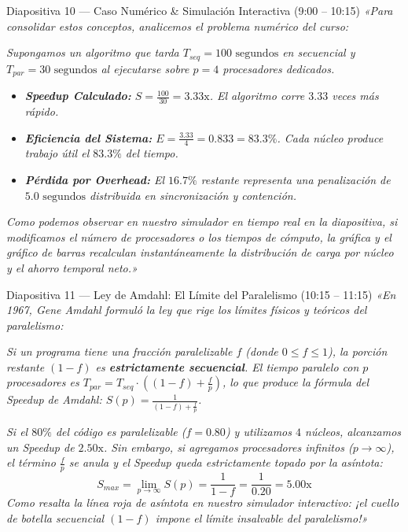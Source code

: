 \documentclass[11pt,a4paper]{article}
\begin{document}
\begin{guionbox}{Diapositiva 10 --- Caso Numérico \& Simulación Interactiva (9:00 -- 10:15)}
\textit{«Para consolidar estos conceptos, analicemos el problema numérico del curso:}

\textit{Supongamos un algoritmo que tarda $T_{seq} = 100\text{ segundos}$ en secuencial y $T_{par} = 30\text{ segundos}$ al ejecutarse sobre $p = 4$ procesadores dedicados.}

\begin{itemize}[leftmargin=5mm]
    \item \textit{\textbf{Speedup Calculado:} $S = \frac{100}{30} = 3.33\text{x}$. El algoritmo corre $3.33$ veces más rápido.}
    \item \textit{\textbf{Eficiencia del Sistema:} $E = \frac{3.33}{4} = 0.833 = 83.3\%$. Cada núcleo produce trabajo útil el $83.3\%$ del tiempo.}
    \item \textit{\textbf{Pérdida por Overhead:} El $16.7\%$ restante representa una penalización de $5.0\text{ segundos}$ distribuida en sincronización y contención.}
\end{itemize}

\textit{Como podemos observar en nuestro simulador en tiempo real en la diapositiva, si modificamos el número de procesadores o los tiempos de cómputo, la gráfica y el gráfico de barras recalculan instantáneamente la distribución de carga por núcleo y el ahorro temporal neto.»}
\end{guionbox}

\begin{guionbox}{Diapositiva 11 --- Ley de Amdahl: El Límite del Paralelismo (10:15 -- 11:15)}
\textit{«En 1967, Gene Amdahl formuló la ley que rige los límites físicos y teóricos del paralelismo:}

\textit{Si un programa tiene una fracción paralelizable $f$ (donde $0 \le f \le 1$), la porción restante $(1-f)$ es \textbf{estrictamente secuencial}. El tiempo paralelo con $p$ procesadores es $T_{par} = T_{seq} \cdot \left((1-f) + \frac{f}{p}\right)$, lo que produce la fórmula del Speedup de Amdahl: $S(p) = \frac{1}{(1-f) + \frac{f}{p}}$.}

\textit{Si el $80\%$ del código es paralelizable ($f = 0.80$) y utilizamos $4$ núcleos, alcanzamos un Speedup de $2.50\text{x}$. Sin embargo, si agregamos procesadores infinitos ($p \to \infty$), el término $\frac{f}{p}$ se anula y el Speedup queda estrictamente topado por la asíntota:}
\[
S_{max} = \lim_{p \to \infty} S(p) = \frac{1}{1-f} = \frac{1}{0.20} = 5.00\text{x}
\]
\textit{Como resalta la línea roja de asíntota en nuestro simulador interactivo: ¡el cuello de botella secuencial $(1-f)$ impone el límite insalvable del paralelismo!»}
\end{guionbox}
\end{document}
